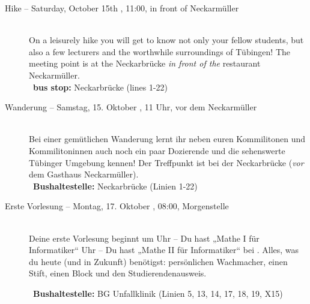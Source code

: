 \begin{description}

\ifml
	\item[Hike -- Saturday, October 15th \YEAR, 11:00, in front of Neckarmüller]~\\
	On a leisurely hike you will get to know not only your fellow students,
	but also a few lecturers and the worthwhile surroundings of Tübingen!
	The meeting point is at the Neckarbrücke \emph{in front of the} restaurant \glqq Neckarmüller\grqq. \\
	~\textbf{bus stop:} Neckarbrücke (lines 1-22)
\else
	\item[Wanderung -- Samstag, 15. Oktober \YEAR, 11 Uhr, vor dem Neckarmüller]~\\
	Bei einer gemütlichen Wanderung lernt ihr neben euren Kommilitonen und Kommilitoninnen auch
	noch ein paar Dozierende und die sehenswerte Tübinger Umgebung kennen!
	Der Treffpunkt ist bei der Neckarbrücke (\emph{vor} dem Gasthaus \glqq Neckarmüller\grqq).\\
	~\textbf{Bushaltestelle:} Neckarbrücke (Linien 1-22) 
\fi

\ifbachelor
	\item[Erste Vorlesung -- Montag, 17. Oktober \YEAR, 08:00, Morgenstelle]~\\
	Deine erste Vorlesung beginnt um
	 Uhr -- Du hast „Mathe I für Informatiker“  \fi
	 Uhr -- Du hast „Mathe II für Informatiker“  \fi
	bei \Matheprof.
	Alles, was du heute (und in Zukunft) benötigst: persönlichen Wachmacher, einen Stift, einen Block und den Studierendenausweis.

	~\textbf{Bushaltestelle:} BG Unfallklinik (Linien 5, 13, 14, 17, 18, 19, X15)
\fi


\end{description}
